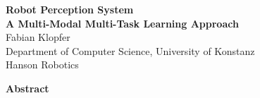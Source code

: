 \begin{titlepage}
\thispagestyle{plain}
   \begin{center}
       \vspace*{1cm}
        \Huge
       \textbf{Robot Perception System} \\
       \Large
       \textbf{A Multi-Modal Multi-Task Learning Approach}\\
       \vspace*{1cm}
       \normalsize
       Fabian Klopfer \\
       Department of Computer Science, University of Konstanz\\
       Hanson Robotics\\
        
        \vspace*{1cm}
        
        \textbf{Abstract}
        
   \end{center}
\end{titlepage}

\newpage
\tableofcontents